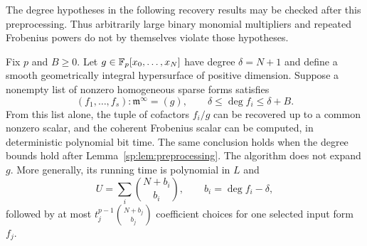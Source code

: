 The degree hypotheses in the following recovery results may be checked
after this preprocessing. Thus arbitrarily large binary monomial
multipliers and repeated Frobenius powers do not by themselves violate
those hypotheses.

\begin{theorem}
\label{sp:thm:bounded-cofactors}
Fix $p$ and $B\geq0$. Let $g\in\mathbb F_p[x_0,\ldots,x_N]$ have degree
$\delta=N+1$ and define a smooth geometrically integral hypersurface of
positive dimension. Suppose a nonempty list of nonzero homogeneous
sparse forms satisfies
\[
 (f_1,\ldots,f_s):\mathfrak m^\infty=(g),\qquad
 \delta\leq\deg f_i\leq\delta+B.
\]
From this list alone, the tuple of cofactors $f_i/g$ can be recovered
up to a common nonzero scalar, and the coherent Frobenius scalar can be
computed, in deterministic polynomial bit time. The same conclusion holds when the
degree bounds hold after Lemma~\ref{sp:lem:preprocessing}. The algorithm does not expand $g$.
More generally, its running time is polynomial in $L$ and
\[
 U=\sum_i\binom{N+b_i}{b_i},\qquad b_i=\deg f_i-\delta,
\]
followed by at most $t_j^{p-1}\binom{N+b_j}{b_j}$ coefficient choices
for one selected input form $f_j$.
\end{theorem}
